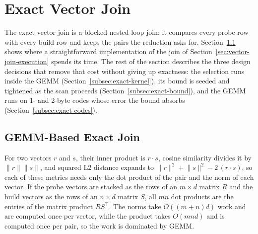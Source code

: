 \section{Exact Vector Join}\label{sec:exact-join}

The exact vector join is a blocked nested-loop join: it compares every probe row with every build row and keeps the pairs the reduction asks for.
Section~\ref{subsec:exact-algo} shows where a straightforward implementation of the join of Section~\ref{sec:vector-join-execution} spends its time.
The rest of the section describes the three design decisions that remove that cost without giving up exactness: the selection runs inside the GEMM (Section~\ref{subsec:exact-kernel}), its bound is seeded and tightened as the scan proceeds (Section~\ref{subsec:exact-bound}), and the GEMM runs on 1- and 2-byte codes whose error the bound absorbs (Section~\ref{subsec:exact-codes}).

\subsection{GEMM-Based Exact Join}\label{subsec:exact-algo}

For two vectors $r$ and $s$, their inner product is $r \cdot s$, cosine similarity divides it by $\lVert r \rVert \lVert s \rVert$, and squared L2 distance expands to $\lVert r \rVert^2 + \lVert s \rVert^2 - 2\, (r \cdot s)$, so each of these metrics needs only the dot product of the pair and the norm of each vector.
If the probe vectors are stacked as the rows of an $m \times d$ matrix $R$ and the build vectors as the rows of an $n \times d$ matrix $S$, all $mn$ dot products are the entries of the matrix product $RS^\top$.
The norms take $O((m+n)d)$ work and are computed once per vector, while the product takes $O(mnd)$ and is computed once per pair, so the work is dominated by GEMM.

